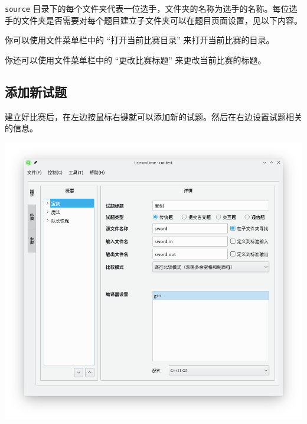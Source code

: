 \documentclass[UTF-8]{ctexart}
\begin{document}
			\texttt{source} 目录下的每个文件夹代表一位选手，文件夹的名称为选手的名称。每位选手的文件夹是否需要对每个题目建立子文件夹可以在题目页面设置，见以下内容。
			
			你可以使用文件菜单栏中的 “打开当前比赛目录” 来打开当前比赛的目录。
			
			你还可以使用文件菜单栏中的 “更改比赛标题” 来更改当前比赛的标题。
			
		\subsection{添加新试题}
		
			建立好比赛后，在左边按鼠标右键就可以添加新的试题。然后在右边设置试题相关的信息。
			
			\begin{center}
			\includegraphics[scale=0.5]{pics/editproblem.png}
			\end{center}
			
\end{document}
